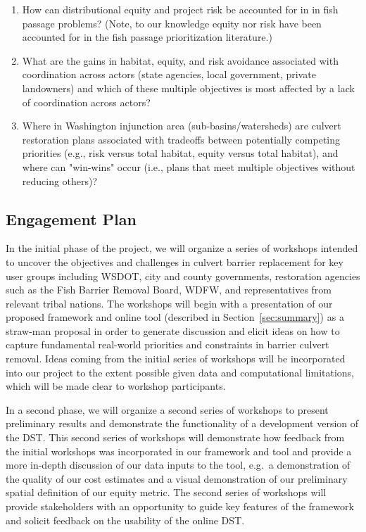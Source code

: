 \documentclass[12pt]{elsarticle}
\begin{document}
	\begin{enumerate}
		\item How can distributional equity and project risk be accounted for in in fish passage problems? (Note, to our knowledge equity nor risk have been accounted for in the fish passage prioritization literature.)
		\item What are the gains in habitat, equity, and risk avoidance associated with coordination across actors (state agencies, local government, private landowners) and which of these multiple objectives is most affected by a lack of coordination across actors?
		\item Where in Washington injunction area (sub-basins/watersheds) are culvert restoration plans associated with tradeoffs between potentially competing priorities (e.g., risk versus total habitat, equity versus total habitat), and where can "win-wins" occur (i.e., plans that meet multiple objectives without reducing others)?
	\end{enumerate}
	
	\subsection{Engagement Plan}\label{sec:engage}
	
	In the initial phase of the project, we will organize a series of workshops intended to uncover the objectives and challenges in culvert barrier replacement for key user groups including WSDOT, city and county governments, restoration agencies such as the Fish Barrier Removal Board, WDFW, and representatives from relevant tribal nations. The workshops will begin with a presentation of our proposed framework and online tool (described in Section~\ref{sec:summary}) as a straw-man proposal in order to generate discussion and elicit ideas on how to capture fundamental real-world priorities and constraints in barrier culvert removal. Ideas coming from the initial series of workshops will be incorporated into our project to the extent possible given data and computational limitations, which will be made clear to workshop participants.
	
	In a second phase, we will organize a second series of workshops to present preliminary results and demonstrate the functionality of a development version of the DST. This second series of workshops will demonstrate how feedback from the initial workshops was incorporated in our framework and tool and provide a more in-depth discussion of our data inputs to the tool, e.g.\ a demonstration of the quality of our cost estimates and a visual demonstration of our preliminary spatial definition of our equity metric. The second series of workshops will provide stakeholders with an opportunity to guide key features of the framework and solicit feedback on the usability of the online DST.
	
\end{document}
